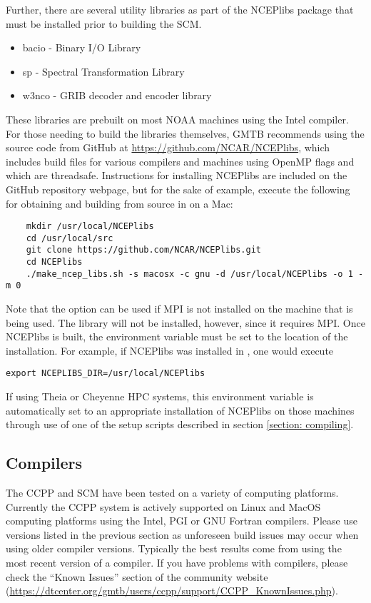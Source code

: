 Further, there are several utility libraries as part of the NCEPlibs package that must be installed prior to building the SCM. 
\begin{itemize}
    \item bacio - Binary I/O Library
    \item sp - Spectral Transformation Library
    \item w3nco - GRIB decoder and encoder library
\end{itemize}
These libraries are prebuilt on most NOAA machines using the Intel compiler. For those needing to build the libraries themselves, GMTB recommends using the source code from GitHub at \url{https://github.com/NCAR/NCEPlibs}, which includes build files for various compilers and machines using OpenMP flags and which are threadsafe. Instructions for installing NCEPlibs are included on the GitHub repository webpage, but for the sake of example, execute the following for obtaining and building from source in  on a Mac:
\begin{lstlisting}
    mkdir /usr/local/NCEPlibs
    cd /usr/local/src
    git clone https://github.com/NCAR/NCEPlibs.git
    cd NCEPlibs
    ./make_ncep_libs.sh -s macosx -c gnu -d /usr/local/NCEPlibs -o 1 -m 0
\end{lstlisting}
Note that the option  can be used if MPI is not installed on the machine that is being used. The  library will not be installed, however, since it requires MPI. Once NCEPlibs is built, the  environment variable must be set to the location of the installation. For example, if NCEPlibs was installed in , one would execute
\begin{lstlisting}
export NCEPLIBS_DIR=/usr/local/NCEPlibs
\end{lstlisting}
If using Theia or Cheyenne HPC systems, this environment variable is automatically set to an appropriate installation of NCEPlibs on those machines through use of one of the setup scripts described in section \ref{section: compiling}.


\subsection{Compilers}
The CCPP and SCM have been tested on a variety of
computing platforms. Currently the CCPP system is actively supported
on Linux and MacOS computing platforms using the Intel, PGI or GNU Fortran
compilers. Please use versions listed in the previous section as unforeseen
build issues may occur when using older compiler versions. Typically the best results come from using the
most recent version of a compiler. If you have problems with compilers, please check the ``Known Issues'' section of the
community website (\url{https://dtcenter.org/gmtb/users/ccpp/support/CCPP_KnownIssues.php}).

